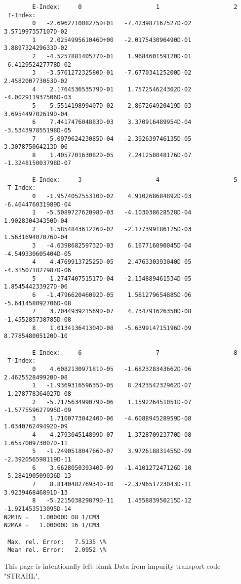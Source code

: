 \documentclass[12pt,dvipdfmx]{article}
\begin{document}
\begin{small}\begin{verbatim}
        E-Index:     0                     1                     2
 T-Index:
        0   -2.696271008275D+01   -7.423987167527D-02    3.571997357107D-02
        1    2.025499561046D+00   -2.017543096490D-01    3.889732429633D-02
        2   -4.525788140577D-01    1.968460159120D-01   -6.412952427778D-02
        3   -3.570127232580D-01   -7.677034125200D-02    2.458200773053D-02
        4    2.176453653579D-01    1.757254624302D-02   -4.002911937506D-03
        5   -5.551419899407D-02   -2.867264920419D-03    3.695449702619D-04
        6    7.441747604883D-03    3.370916489954D-04   -3.534397855198D-05
        7   -5.097962423085D-04   -2.392639746135D-05    3.307875064213D-06
        8    1.405770163082D-05    7.241258048176D-07   -1.324815003798D-07

        E-Index:     3                     4                     5
 T-Index:
        0   -1.957405255310D-02    4.910268684892D-03   -6.464476031989D-04
        1   -5.508972762098D-03   -4.103038628528D-04    1.902830434350D-04
        2    1.585484361226D-02   -2.177399186175D-03    1.563169407076D-04
        3   -4.639868259732D-03    6.167716090045D-04   -4.549330605404D-05
        4    4.476991372525D-05    2.476330393040D-05   -4.315071827987D-06
        5    1.274740751517D-04   -2.134889461534D-05    1.854544233927D-06
        6   -1.479662046092D-05    1.581279654885D-06   -5.641458092706D-08
        7    3.704493921569D-07    4.734791626350D-08   -1.455285738785D-08
        8    1.013413641304D-08   -5.639914715196D-09    8.778548005120D-10

        E-Index:     6                     7                     8
 T-Index:
        0    4.608213097181D-05   -1.682328343662D-06    2.462552849920D-08
        1   -1.936931659635D-05    8.242354232962D-07   -1.278778364027D-08
        2   -5.717563499079D-06    1.159226451051D-07   -1.577559627995D-09
        3    1.710077304240D-06   -4.608894528959D-08    1.034076249492D-09
        4    4.279304514899D-07   -1.372870923770D-08    1.655700973007D-11
        5   -1.249051804766D-07    3.972618831455D-09   -2.392056598119D-11
        6    3.662805039340D-09   -1.410127247126D-10   -5.284190509036D-13
        7    8.814048276934D-10   -2.379651723043D-11    3.923946846891D-13
        8   -5.221503829879D-11    1.455883950215D-12   -1.921453513095D-14
N2MIN =   1.00000D 08 1/CM3
N2MAX =   1.00000D 16 1/CM3

 Max. rel. Error:   7.5135 \%
 Mean rel. Error:   2.0952 \%

\end{verbatim}\end{small}
\newpage
This page is intentionally left blank
\newpage
Data from impurity transport code "STRAHL", \cite{kn:Behringer}
\end{document}
